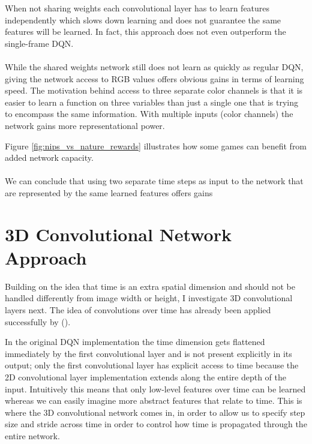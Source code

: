 When not sharing weights each convolutional layer
has to learn features independently which slows down learning
and does not guarantee the same features will be learned.
In fact, this approach does not even outperform
the single-frame DQN.

\paragraph{}
While  the shared weights network
still does not learn as quickly as regular DQN,
giving the network access to RGB values offers obvious gains
in terms of learning speed.
The motivation behind access to three separate color channels
is that it is easier to learn a function on three variables
than just a single one
that is trying to encompass the same information.
With multiple inputs (color channels)
the network gains more representational power.

Figure \ref{fig:nips_vs_nature_rewards}
illustrates how some games can benefit
from added network capacity.

\paragraph{}
We can conclude that using two separate time steps
as input to the network
that are represented by the same learned features
offers gains

\section{3D Convolutional Network Approach}
\label{sec:3d_convolutional_network_approach}
Building on the idea that time is an extra spatial dimension
and should not be handled differently
from image width or height,
I investigate 3D convolutional layers next.
The idea of convolutions over time has already been
applied successfully by \citeauthor{claessens} (\citeyear{claessens}).

In the original DQN implementation
the time dimension gets flattened immediately
by the first convolutional layer
and is not present explicitly
in its output;
only the first convolutional layer
has explicit access to time
because the 2D convolutional layer implementation
extends along the entire depth of the input.
Intuitively this means that only low-level
features over time can be learned
whereas we can easily imagine
more abstract features
that relate to time.
This is where the 3D convolutional network comes in,
in order to allow us to specify step size and stride across time
in order to control how time is propagated through the entire network.

